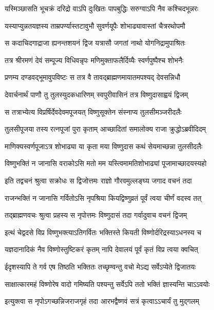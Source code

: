 \twolineshloka
{यस्मिञ्छासति भूचक्रं दरिद्रो वाऽपि दुःखितः}
{पापबुद्धिः सरुग्वाऽपि नैव कश्चिदभून्नरः} %

\twolineshloka
{यस्याप्युन्नतयज्ञस्य ताम्रपर्ण्यास्तटावुभौ}
{सुवर्णयूपैः शोभाढ्यावास्तां चैत्ररथोपमौ} %

\twolineshloka
{स कदाचिदगाद्राजा ह्यनन्तशयनं द्विज}
{यत्रासौ जगतां नाथो योगनिद्रामुपाश्रितः} %

\twolineshloka
{तत्र श्रीरमणं देवं सम्पूज्य विधिवन्नृपः}
{मणिमुक्ताफलैर्दिव्यैः स्वर्णपुष्पैश्च शोभनैः} %

\twolineshloka
{प्रणम्य दण्डवद्भूमावुपविष्टः स तत्र वै}
{तावद्ब्राह्मणमायातमपश्यद् देवसन्निधौ} %

\twolineshloka
{देवार्चनार्थं पाणौ तु तुलस्युदकधारिणम्}
{स्वपुरीवासिनं तत्र विष्णुदासाह्वयं द्विजम्} %

\twolineshloka
{स तत्राभ्येत्य विप्रर्षिर्देवदेवमपूजयत्}
{विष्णुसूक्तेन संस्नाप्य तुलसीमञ्जरीदलैः} %

\twolineshloka
{तुलसीपूजया तस्य रत्नपूजां पुरा कृताम्}
{आच्छादितां समालोक्य राजा क्रुद्धोऽब्रवीदिदम्} %


\twolineshloka
{माणिक्यस्वर्णपूजाऽत्र शोभाढ्या या कृता मया}
{विष्णुदास कथं सेयमाच्छन्ना तुलसीदलैः} %

\twolineshloka
{विष्णुभक्तिं न जानासि वराकोऽसि मतो मम}
{यस्त्विमामतिशोभाढ्यां पूजामाच्छादयस्यहो} %

\twolineshloka
{इति तद्वचनं श्रुत्वा सक्रोधः स द्विजोत्तमः}
{राज्ञो गौरवमुल्लङ्घ्य जगाद वचनं तदा} %


\twolineshloka
{राजन्भक्तिं न जानासि गर्वितोऽसि नृपश्रिया}
{कियद्विष्णुव्रतं पूर्वं त्वया चीर्णं वदस्व तत्} %


\twolineshloka
{तद्ब्राह्मणवचः श्रुत्वा प्रहस्य स नृपोत्तमः}
{विष्णुदासं तदा गर्वादुवाच वचनं द्विजम्} %


\twolineshloka
{इत्थं चेद्वदसे विप्र विष्णुभक्त्याऽतिगर्वितः}
{भक्तिस्ते कियती विष्णोर्दरिद्रस्याऽधनस्य च} %


\twolineshloka
{यज्ञदानादिकं नैव विष्णोस्तुष्टिकरं कृतम्}
{नापि देवालयं पूर्वं कृतं विप्र त्वया क्वचित्} %

\twolineshloka
{ईदृशस्यापि ते गर्व एष तिष्ठति भक्तितः}
{तच्छृण्वन्तु वचो मेऽद्य सर्वेऽप्येते द्विजातयः} %

\twolineshloka
{साक्षात्कारमहं विष्णोरेष वादो गमिष्यति}
{पश्यन्तु सर्वेऽपि ततो भक्तिं ज्ञास्यन्ति चाऽऽवयोः} %


\twolineshloka
{इत्युक्त्वा स नृपोऽगच्छन्निजराजगृहं तदा}
{आरभद्वैष्णवं सत्रं कृत्वाऽऽचार्यं तु मुद्गलम्} %


